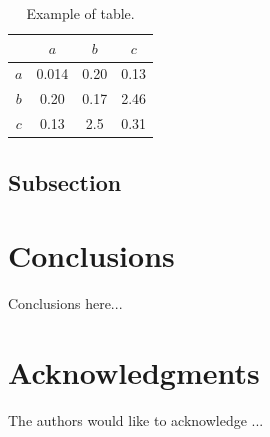 \documentclass[a4paper,fleqn]{cas-sc}
\begin{document}
\begin{table}
\centering
\caption{Example of table.}
\label{tab:Table1}
\begin{tabular}{ |c||c|c|c|} 
 \hline
     & $a$  &  $b$  &  $c$\\ 
 \hline 
 \hline
$a$ & 0.014 &  0.20    &   0.13  \\
\hline
$b$ & 0.20    &   0.17    &   2.46    \\
\hline
$c$ & 0.13    &   2.5     &   0.31   \\
\hline
\end{tabular} 
\end{table}


\subsection{Subsection}


\section{Conclusions}

Conclusions here...

\section{Acknowledgments}

The authors would like to acknowledge ...

\printcredits


 
\end{document}
